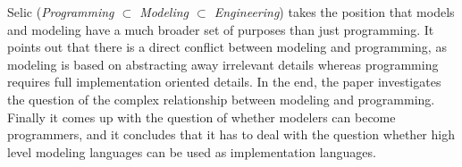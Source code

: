 


Selic
\cite{isola-2016-selic}
({\em Programming $\subset$ Modeling $\subset$ Engineering})
takes the position that models and modeling have a much broader set of purposes than just programming. It points out that there is a direct conflict between modeling and programming, as modeling is based on abstracting away irrelevant details whereas programming requires full implementation oriented details. In the end, the paper investigates the question of the complex relationship between modeling and programming. Finally it comes up with the question of whether modelers can become programmers, and it concludes that it has to deal with the question whether high level modeling languages can be used as implementation languages.
 
